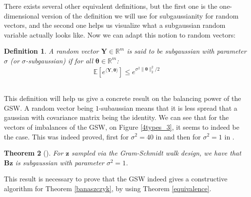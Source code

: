 \documentclass[12pt]{article}
\newtheorem{theorem}{Theorem}
\newtheorem{definition}[theorem]{Definition}
\begin{document}
There exists several other equivalent definitions, but the first one is the one-dimensional version of the definition we will use for subgaussianity for random vectors, and the second one helps us visualize what a subgaussian random variable actually looks like. Now we can adapt this notion to random vectors:
\begin{definition}
A random vector $\textbf{Y} \in \mathbb{R}^m$ is said to be subgaussian with parameter $\sigma$ (or $\sigma$-subgaussian) if for all $\bm{\theta} \in \mathbb{R}^m$:
$$\mathbb{E}\left[e^{\langle\textbf{Y},\bm{\theta}\rangle}\right]\leq e^{\sigma^2\|\bm{\theta}\|_2^2/2}$$ \\
\end{definition}
This definition will help us give a concrete result on the balancing power of the GSW. A random vector being $1$-subaussian means that it is less spread that a gaussian with covariance matrix being the identity. We can see that for the vectors of imbalances of the GSW, on Figure \ref{4types_3}, it seems to indeed be the case. This was indeed proved, first for $\sigma^2=40$ in \cite{blues} and then for $\sigma^2=1$ in \cite{harshaw2019balancing}.
\begin{theorem}[\cite{harshaw2019balancing}]
    For $\textbf{z}$ sampled via the Gram-Schmidt walk design, we have that $\textbf{Bz}$ is subgaussian with parameter $\sigma^2=1$.%
\end{theorem}
This result is necessary to prove that the GSW indeed gives a constructive algorithm for Theorem \ref{banaszczyk}, by using Theorem \ref{equivalence}.



\end{document}
